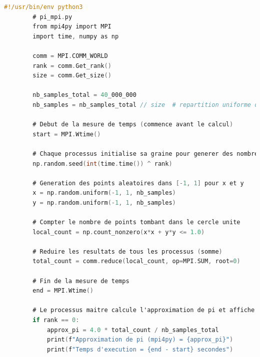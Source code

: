 \documentclass[a4paper,13pt]{book}
\begin{document}
	\begin{lstlisting}[language=C, caption=Code source de \texttt{pi\_mpi.py}]
        #!/usr/bin/env python3
        # pi_mpi.py
        from mpi4py import MPI
        import time, numpy as np
        
        comm = MPI.COMM_WORLD
        rank = comm.Get_rank()
        size = comm.Get_size()
        
        nb_samples_total = 40_000_000
        nb_samples = nb_samples_total // size  # repartition uniforme des echantillons
        
        # Debut de la mesure de temps (commence avant le calcul)
        start = MPI.Wtime()
        
        # Chaque processus initialise sa graine pour generer des nombres aleatoires differents
        np.random.seed(int(time.time()) ^ rank)
        
        # Generation des points aleatoires dans [-1, 1] pour x et y
        x = np.random.uniform(-1, 1, nb_samples)
        y = np.random.uniform(-1, 1, nb_samples)
        
        # Compter le nombre de points tombant dans le cercle unite
        local_count = np.count_nonzero(x*x + y*y <= 1.0)
        
        # Reduire les resultats de tous les processus (somme)
        total_count = comm.reduce(local_count, op=MPI.SUM, root=0)
        
        # Fin de la mesure de temps
        end = MPI.Wtime()
        
        # Le processus maitre calcule l'approximation de pi et affiche le temps d'execution
        if rank == 0:
            approx_pi = 4.0 * total_count / nb_samples_total
            print(f"Approximation de pi (mpi4py) = {approx_pi}")
            print(f"Temps d'execution = {end - start} secondes")
        
        
\end{lstlisting}
\end{document}
